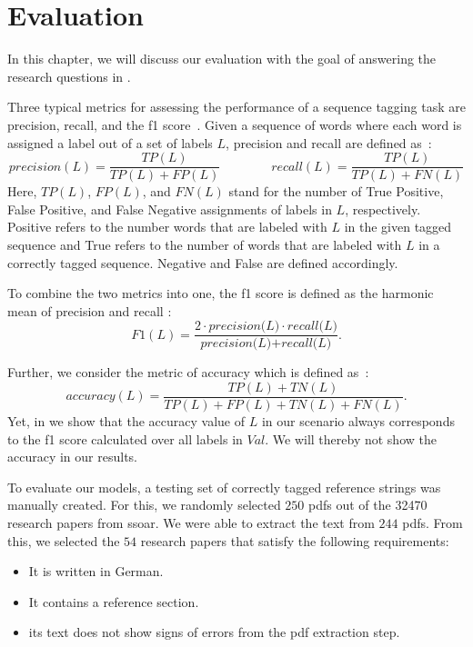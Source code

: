 \chapter{Evaluation}\label{cha:evaluation}

In this chapter, we will discuss our evaluation with the goal of answering the research questions in .

Three typical metrics for assessing the performance of a sequence tagging task are \gls{precision}, \gls{recall}, and the \gls{f1 score}~\citep{councill2008parscit}.
Given a sequence of words where each word is assigned a label out of a set of labels $L$, \gls{precision} and \gls{recall} are defined as~\citep{goutte2005probabilistic}:
\begin{equation*}
  \textit{precision}(L)=\frac{TP(L)}{TP(L)+FP(L)}\hspace{4em}\textit{recall}(L)=\frac{TP(L)}{TP(L)+FN(L)}
\end{equation*}
Here, $TP(L)$, $FP(L)$, and $FN(L)$ stand for the number of True Positive, False Positive, and False Negative assignments of labels in $L$, respectively.
Positive refers to the number words that are labeled with $L$ in the given tagged sequence and True refers to the number of words that are labeled with $L$ in a correctly tagged sequence.
Negative and False are defined accordingly.

To combine the two metrics into one, the \gls{f1 score} is defined as the harmonic mean of \gls{precision} and \gls{recall} \citep{bilenko2003adaptive}:
\begin{equation*}
  \textit{F1}(L)=\frac{2\cdot\textit{precision(L)}\cdot\textit{recall(L)}}{\textit{precision(L)}+\textit{recall(L)}}.
\end{equation*}

Further, we consider the metric of \gls{accuracy} which is defined as~\citep{powers2011evaluation}:
\begin{equation*}
  \textit{accuracy}(L)=\frac{TP(L)+TN(L)}{TP(L)+FP(L)+TN(L)+FN(L)}.
\end{equation*}
Yet, in  we show that the accuracy value of $L$ in our scenario always corresponds to the \gls{f1 score} calculated over all labels in $\textit{Val}$.
We will thereby not show the accuracy in our results.

\bigskip

To evaluate our models, a testing set of correctly tagged reference strings was manually created.
For this, we randomly selected $250$ \glspl{pdf} out of the \num{32470} research papers from \gls{ssoar}.
We were able to extract the text from $244$ \glspl{pdf}.
From this, we selected the $54$ research papers that satisfy the following requirements:
\begin{itemize}
  \item It is written in German.
  \item It contains a reference section.
  \item its text does not show signs of errors from the \gls{pdf} extraction step.
\end{itemize}

